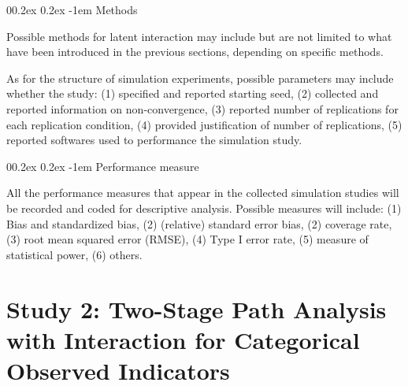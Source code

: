 \documentclass[
  man]{apa6}
\makeatletter
\let\oldparagraph\paragraph
\renewcommand{\paragraph}[1]{\oldparagraph{#1}\mbox{}}
\renewcommand{\paragraph}{\@startsection{paragraph}{4}{\parindent}%
  {0\baselineskip \@plus 0.2ex \@minus 0.2ex}%
  {-1em}%
  {\normalfont\normalsize\bfseries\itshape\typesectitle}}
\makeatother
\begin{document}
\hypertarget{methods-1}{%
\paragraph{Methods}\label{methods-1}}

Possible methods for latent interaction may include but are not limited to what have been introduced in the previous sections, depending on specific methods.

As for the structure of simulation experiments, possible parameters may include whether the study: (1) specified and reported starting seed, (2) collected and reported information on non-convergence, (3) reported number of replications for each replication condition, (4) provided justification of number of replications, (5) reported softwares used to performance the simulation study.

\hypertarget{performance-measure}{%
\paragraph{Performance measure}\label{performance-measure}}

All the performance measures that appear in the collected simulation studies will be recorded and coded for descriptive analysis. Possible measures will include: (1) Bias and standardized bias, (2) (relative) standard error bias, (2) coverage rate, (3) root mean squared error (RMSE), (4) Type I error rate, (5) measure of statistical power, (6) others.

\newpage

\hypertarget{study-2-two-stage-path-analysis-with-interaction-for-categorical-observed-indicators}{%
\section{Study 2: Two-Stage Path Analysis with Interaction for Categorical Observed Indicators}\label{study-2-two-stage-path-analysis-with-interaction-for-categorical-observed-indicators}}
\end{document}
